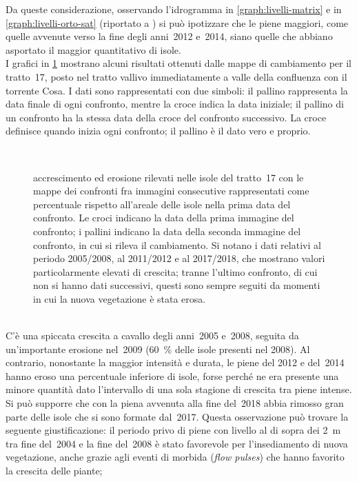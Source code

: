 Da queste considerazione, osservando l'idrogramma in \cref{graph:livelli-matrix} e in \cref{graph:livelli-orto-sat} (riportato a ) si può ipotizzare che le piene maggiori, come quelle avvenute verso la fine degli anni~2012 e~2014, siano quelle che abbiano asportato il maggior quantitativo di isole.
\\
I grafici in \cref{graph:tr-17-camb} mostrano alcuni risultati ottenuti dalle mappe di cambiamento per il tratto~17, posto nel tratto vallivo immediatamente a valle della confluenza con il torrente Cosa.
I dati sono rappresentati con due simboli: il pallino rappresenta la data finale di ogni confronto, mentre la croce indica la data iniziale; il pallino di un confronto ha la stessa data della croce del confronto successivo. 
La croce definisce quando inizia ogni confronto; il pallino è il dato vero e proprio.
%
\begin{figure}
	\centering
	
	\\
	
	\caption[cambiamenti rilevati nelle isole nel tratto~17]{accrescimento ed erosione rilevati nelle isole del tratto~17 con le mappe dei confronti fra immagini consecutive rappresentati come percentuale rispetto all'areale delle isole nella prima data del confronto.
	Le croci indicano la data della prima immagine del confronto; i pallini indicano la data della seconda immagine del confronto, in cui si rileva il cambiamento.
	Si notano i dati relativi al periodo 2005/2008, al 2011/2012 e al 2017/2018, che mostrano valori particolarmente elevati di crescita; tranne l'ultimo confronto, di cui non si hanno dati successivi, questi sono sempre seguiti da momenti in cui la nuova vegetazione è stata erosa.}
	\label{graph:tr-17-camb}
\end{figure}
%
\\
C'è una spiccata crescita a cavallo degli anni~2005 e~2008, seguita da un'importante erosione nel~2009 (\SI{60}{\percent} delle isole presenti nel 2008).
Al contrario, nonostante la maggior intensità e durata, le piene del 2012 e del~2014 hanno eroso una percentuale inferiore di isole, forse perché ne era presente una minore quantità dato l'intervallo di una sola stagione di crescita tra piene intense.
\\
Si può supporre che con la piena avvenuta alla fine del~2018 abbia rimosso gran parte delle isole che si sono formate dal~2017.
Questa osservazione può trovare la seguente giustificazione: il periodo privo di piene con livello al di sopra dei \SI{2}{\m} tra fine del~2004 e la fine del~2008 è stato favorevole per l'insediamento di nuova vegetazione, anche grazie agli eventi di morbida (\emph{flow pulses}) che hanno favorito la crescita delle piante;
